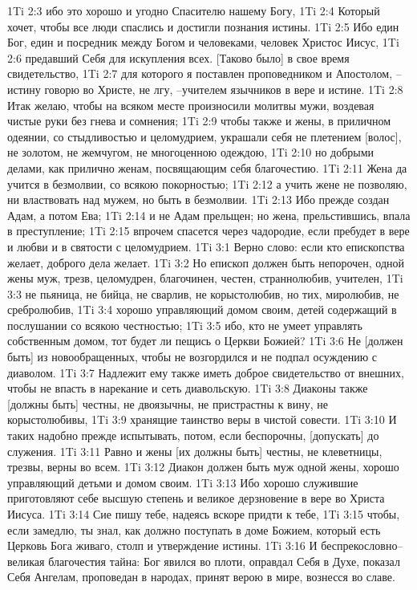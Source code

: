 1Ti 2:3  ибо это хорошо и угодно Спасителю нашему Богу,
1Ti 2:4  Который хочет, чтобы все люди спаслись и достигли познания истины.
1Ti 2:5  Ибо един Бог, един и посредник между Богом и человеками, человек Христос Иисус,
1Ti 2:6  предавший Себя для искупления всех. [Таково было] в свое время свидетельство,
1Ti 2:7  для которого я поставлен проповедником и Апостолом, --истину говорю во Христе, не лгу, --учителем язычников в вере и истине.
1Ti 2:8  Итак желаю, чтобы на всяком месте произносили молитвы мужи, воздевая чистые руки без гнева и сомнения;
1Ti 2:9  чтобы также и жены, в приличном одеянии, со стыдливостью и целомудрием, украшали себя не плетением [волос], не золотом, не жемчугом, не многоценною одеждою,
1Ti 2:10  но добрыми делами, как прилично женам, посвящающим себя благочестию.
1Ti 2:11  Жена да учится в безмолвии, со всякою покорностью;
1Ti 2:12  а учить жене не позволяю, ни властвовать над мужем, но быть в безмолвии.
1Ti 2:13  Ибо прежде создан Адам, а потом Ева;
1Ti 2:14  и не Адам прельщен; но жена, прельстившись, впала в преступление;
1Ti 2:15  впрочем спасется через чадородие, если пребудет в вере и любви и в святости с целомудрием.
1Ti 3:1  Верно слово: если кто епископства желает, доброго дела желает.
1Ti 3:2  Но епископ должен быть непорочен, одной жены муж, трезв, целомудрен, благочинен, честен, страннолюбив, учителен,
1Ti 3:3  не пьяница, не бийца, не сварлив, не корыстолюбив, но тих, миролюбив, не сребролюбив,
1Ti 3:4  хорошо управляющий домом своим, детей содержащий в послушании со всякою честностью;
1Ti 3:5  ибо, кто не умеет управлять собственным домом, тот будет ли пещись о Церкви Божией?
1Ti 3:6  Не [должен быть] из новообращенных, чтобы не возгордился и не подпал осуждению с диаволом.
1Ti 3:7  Надлежит ему также иметь доброе свидетельство от внешних, чтобы не впасть в нарекание и сеть диавольскую.
1Ti 3:8  Диаконы также [должны быть] честны, не двоязычны, не пристрастны к вину, не корыстолюбивы,
1Ti 3:9  хранящие таинство веры в чистой совести.
1Ti 3:10  И таких надобно прежде испытывать, потом, если беспорочны, [допускать] до служения.
1Ti 3:11  Равно и жены [их должны быть] честны, не клеветницы, трезвы, верны во всем.
1Ti 3:12  Диакон должен быть муж одной жены, хорошо управляющий детьми и домом своим.
1Ti 3:13  Ибо хорошо служившие приготовляют себе высшую степень и великое дерзновение в вере во Христа Иисуса.
1Ti 3:14  Сие пишу тебе, надеясь вскоре придти к тебе,
1Ti 3:15  чтобы, если замедлю, ты знал, как должно поступать в доме Божием, который есть Церковь Бога живаго, столп и утверждение истины.
1Ti 3:16  И беспрекословно--великая благочестия тайна: Бог явился во плоти, оправдал Себя в Духе, показал Себя Ангелам, проповедан в народах, принят верою в мире, вознесся во славе.
